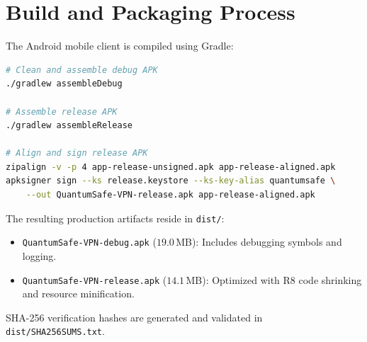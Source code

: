 \section{Build and Packaging Process}
\label{sec:build_packaging_process}

The Android mobile client is compiled using Gradle:
\begin{lstlisting}[language=bash, caption={APK Compilation and Packaging Commands.}]
# Clean and assemble debug APK
./gradlew assembleDebug

# Assemble release APK
./gradlew assembleRelease

# Align and sign release APK
zipalign -v -p 4 app-release-unsigned.apk app-release-aligned.apk
apksigner sign --ks release.keystore --ks-key-alias quantumsafe \
    --out QuantumSafe-VPN-release.apk app-release-aligned.apk
\end{lstlisting}

The resulting production artifacts reside in \texttt{dist/}:
\begin{itemize}
    \item \texttt{QuantumSafe-VPN-debug.apk} ($19.0$\,MB): Includes debugging symbols and logging.
    \item \texttt{QuantumSafe-VPN-release.apk} ($14.1$\,MB): Optimized with R8 code shrinking and resource minification.
\end{itemize}
SHA-256 verification hashes are generated and validated in \texttt{dist/SHA256SUMS.txt}.
